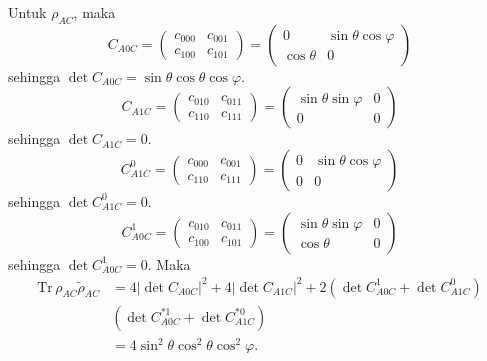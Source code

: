 Untuk $\rho_{AC}$, maka
\begin{equation}
	C_{A0C}=
	\begin{pmatrix}
		c_{000} & c_{001} \\
		c_{100} & c_{101}
	\end{pmatrix}=
	\begin{pmatrix}
		0 & \sin\theta\cos\varphi \\
		\cos\theta & 0
	\end{pmatrix}
\end{equation}
sehingga $\det C_{A0C} = \sin\theta\cos\theta\cos\varphi$.
\begin{equation}
	C_{A1C}=
	\begin{pmatrix}
		c_{010} & c_{011} \\
		c_{110} & c_{111}
	\end{pmatrix}=
	\begin{pmatrix}
		\sin\theta\sin\varphi & 0 \\
		0 & 0
	\end{pmatrix}
\end{equation}
sehingga $\det C_{A1C} = 0$.
\begin{equation}
	C_{A1C}^0=
	\begin{pmatrix}
		c_{000} & c_{001} \\
		c_{110} & c_{111}
	\end{pmatrix}=
	\begin{pmatrix}
		0 & \sin\theta\cos\varphi \\
		0 & 0
	\end{pmatrix}
\end{equation}
sehingga $\det C_{A1C}^0 = 0$.
\begin{equation}
	C_{A0C}^1=
	\begin{pmatrix}
		c_{010} & c_{011} \\
		c_{100} & c_{101}
	\end{pmatrix}=
	\begin{pmatrix}
		\sin\theta\sin\varphi & 0 \\
		\cos\theta & 0
	\end{pmatrix}
\end{equation}
sehingga $\det C_{A0C}^1 = 0$. Maka
\begin{equation}
	\begin{aligned}
		\mathrm{Tr}\,\rho_{AC}\tilde{\rho}_{AC}
		&=4 |\det C_{A0C}|^2+ 4 |\det C_{A1C}|^2+ 2 (\det C_{A0C}^1 + \det C_{A1C}^0)\\
		&(\det C^{*1}_{A0C} + \det C^{*0}_{A1C})\\
		&=4\sin^2\theta \cos^2\theta \cos^2\varphi.
	\end{aligned}
\end{equation}
